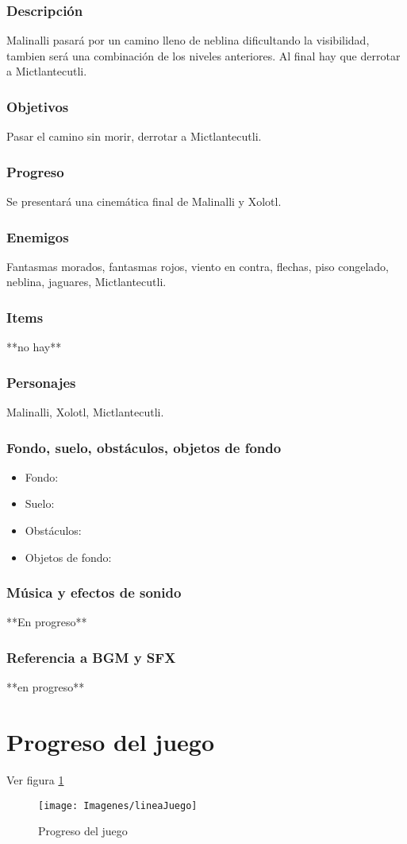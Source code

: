 \documentclass[11pt,letterpaper]{article}
\begin{document}
	\subsubsection{Descripción}
	Malinalli pasará por un camino lleno de neblina dificultando la visibilidad, tambien será una combinación de los niveles anteriores. Al final hay que derrotar a Mictlantecutli.
	\subsubsection{Objetivos}
	Pasar el camino sin morir, derrotar a Mictlantecutli.
	\subsubsection{Progreso}
	Se presentará una cinemática final de Malinalli y Xolotl.
	\subsubsection{Enemigos}
	Fantasmas morados, fantasmas rojos, viento en contra, flechas, piso congelado, neblina, jaguares, Mictlantecutli.
	\subsubsection{Items}
	**no hay**
	\subsubsection{Personajes}
	Malinalli, Xolotl, Mictlantecutli.
	\subsubsection{Fondo, suelo, obstáculos, objetos de fondo}
\begin{itemize} 
	\item Fondo:
	\item Suelo:
	\item Obstáculos:
	\item Objetos de fondo:
\end{itemize}	
	\subsubsection{Música y efectos de sonido}
	**En progreso**
	\subsubsection{Referencia a BGM y SFX}
	**en progreso**
\section{Progreso del juego}
Ver figura \ref{fig:ProgJuego}
\begin{figure}
  \centering
     \texttt{[image: Imagenes/lineaJuego]}
  \caption{Progreso del juego}
  \label{fig:ProgJuego}
\end{figure} 
\end{document}
